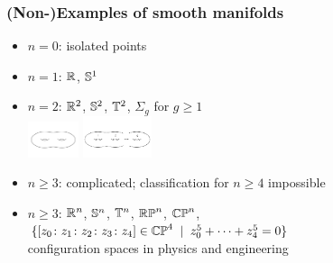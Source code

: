 \begin{frame} %
  \frametitle{(Non-)Examples of smooth manifolds}
  \begin{itemize}
  \item $n=0$: isolated points
  \item $n=1$: $\mathbb{R}$, $\mathbb{S}^{1}$ %
  \item $n=2$: $\mathbb{R}^2$, $\mathbb{S}^{2}$, $\mathbb{T}^2$, $\Sigma_g$ for $g\geq 1$\\
  \includegraphics[width=1.5cm]{images/surface_genus_2.png}
  \includegraphics[width=2cm]{images/surface_genus_g.png}\pause
  \item $n\geq 3$: complicated; classification for $n\geq 4$ impossible
  \item $n\geq 3$: $\mathbb{R}^n$, $\mathbb{S}^{n}$, $\mathbb{T}^{n}$, $\mathbb{RP}^{n}$, $\mathbb{CP}^{n}$, $\{ [z_0\colon z_1\colon z_2\colon z_3\colon z_4]\in\mathbb{CP}^{4}\;\mid\; z_0^5+\dots+z_4^5=0\}$\\
  configuration spaces in physics and engineering
  \end{itemize}
\end{frame}


